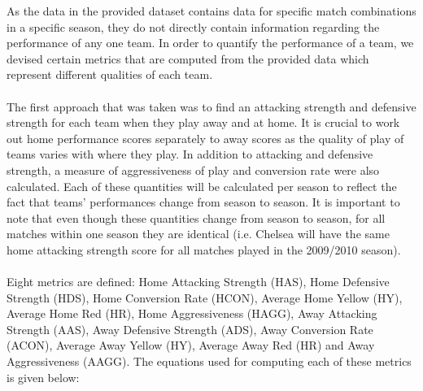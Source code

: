 \documentclass[a4paper,12pt]{article}
\begin{document}
	As the data in the provided dataset contains data for specific match combinations in a specific season, they do not directly contain information regarding the performance of any one team. In order to quantify the performance of a team, we devised certain metrics that are computed from the provided data which represent different qualities of each team. \\
	\\
	The first approach that was taken was to find an attacking strength and defensive strength for each team when they play away and at home. It is crucial to work out home performance scores separately to away scores as the quality of play of teams varies with where they play. In addition to attacking and defensive strength, a measure of aggressiveness of play and conversion rate were also calculated. Each of these quantities will be calculated per season to reflect the fact that teams’ performances change from season to season. It is important to note that even though these quantities change from season to season, for all matches within one season they are identical (i.e. Chelsea will have the same home attacking strength score for all matches played in the 2009/2010 season).\\
	\\
	Eight metrics are defined: Home Attacking Strength (HAS), Home Defensive Strength (HDS), Home Conversion Rate (HCON), Average Home Yellow (HY), Average Home Red (HR), Home Aggressiveness (HAGG), Away Attacking Strength (AAS), Away Defensive Strength (ADS), Away Conversion Rate (ACON), Average Away Yellow (HY), Average Away Red (HR) and Away Aggressiveness (AAGG). The equations used for computing each of these metrics is given below:
	
\end{document}

